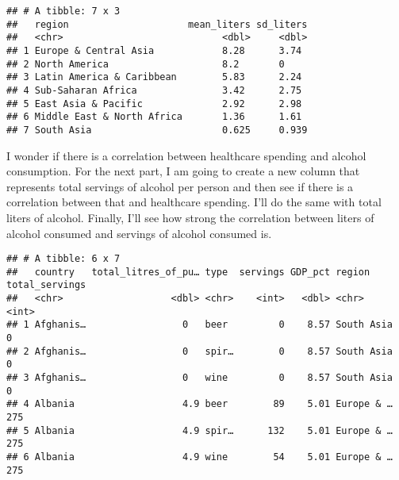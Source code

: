 \documentclass[]{article}
\newenvironment{Shaded}{\begin{snugshade}}{\end{snugshade}}
\newcommand{\KeywordTok}[1]{\textcolor[rgb]{0.13,0.29,0.53}{\textbf{#1}}}
\newcommand{\DataTypeTok}[1]{\textcolor[rgb]{0.13,0.29,0.53}{#1}}
\newcommand{\StringTok}[1]{\textcolor[rgb]{0.31,0.60,0.02}{#1}}
\newcommand{\OperatorTok}[1]{\textcolor[rgb]{0.81,0.36,0.00}{\textbf{#1}}}
\newcommand{\NormalTok}[1]{#1}
\begin{document}
\begin{Shaded}
\end{Shaded}

\begin{verbatim}
## # A tibble: 7 x 3
##   region                     mean_liters sd_liters
##   <chr>                            <dbl>     <dbl>
## 1 Europe & Central Asia            8.28      3.74 
## 2 North America                    8.2       0    
## 3 Latin America & Caribbean        5.83      2.24 
## 4 Sub-Saharan Africa               3.42      2.75 
## 5 East Asia & Pacific              2.92      2.98 
## 6 Middle East & North Africa       1.36      1.61 
## 7 South Asia                       0.625     0.939
\end{verbatim}

I wonder if there is a correlation between healthcare spending and
alcohol consumption. For the next part, I am going to create a new
column that represents total servings of alcohol per person and then see
if there is a correlation between that and healthcare spending. I'll do
the same with total liters of alcohol. Finally, I'll see how strong the
correlation between liters of alcohol consumed and servings of alcohol
consumed is.

\begin{Shaded}
\end{Shaded}

\begin{verbatim}
## # A tibble: 6 x 7
##   country   total_litres_of_pu… type  servings GDP_pct region     total_servings
##   <chr>                   <dbl> <chr>    <int>   <dbl> <chr>               <int>
## 1 Afghanis…                 0   beer         0    8.57 South Asia              0
## 2 Afghanis…                 0   spir…        0    8.57 South Asia              0
## 3 Afghanis…                 0   wine         0    8.57 South Asia              0
## 4 Albania                   4.9 beer        89    5.01 Europe & …            275
## 5 Albania                   4.9 spir…      132    5.01 Europe & …            275
## 6 Albania                   4.9 wine        54    5.01 Europe & …            275
\end{verbatim}
\end{document}
